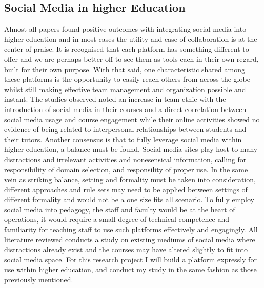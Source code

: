 \documentclass[lettersize,journal]{IEEEtran}
\begin{document}
	\subsection{Social Media in higher Education}
	Almost all papers found positive outcomes with integrating social media into higher education and in most cases the utility and ease
	of collaboration is at the center of praise. It is recognised that each platform has something different to offer and we are perhaps 
	better off to see them as tools each in their own regard, built for their own purpose. With that said, one characteristic shared among these platforms
	 is the opportunity to easily reach others from across the globe whilst still making effective team management and organization possible and instant.
	 The studies observed noted an increase in team ethic with the introduction of social media in their courses and a direct correlation between
	 social media usage and course engagement while their online activities showed no evidence of being related to interpersonal relationships
	 between students and their tutors. Another consensus is that to fully leverage social media within higher education, a balance must be found.
	 Social media sites play host to many distractions and irrelevant activities and nonesensical information, calling for responsibility of domain
	 selection, and responsility of proper use. In the same vein as striking balance, setting and formality must be taken into consideration, different
	 approaches and rule sets may need to be applied between settings of different formality and would not be a one size fits all scenario. To fully 
	 employ social media into pedagogy, the staff and faculty would be at the heart of operations, it would require a small degree of technical competence and
	 familiarity for teaching staff to use such platforms effectively and engagingly.
	 All literature reviewed conducts a study on existing mediums of social media where distractions already exist and the courses may have altered slightly  to
	 fit into social media space. For this research project I will build a platform expressly for use within higher education,
	 and conduct my study in the same fashion as those previously mentioned.
\end{document}
